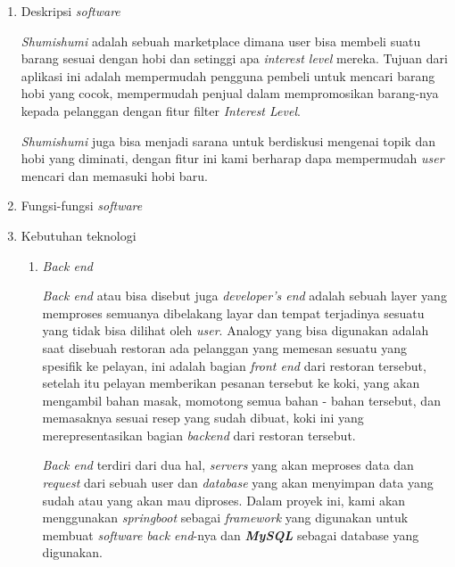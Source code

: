 \documentclass[a4paper]{article}
\begin{document}
\begin{enumerate}[label=\alph*. ]
    \item Deskripsi \textit{software}
    
    \textit{Shumishumi} adalah sebuah marketplace dimana user bisa membeli suatu barang sesuai dengan hobi dan setinggi apa \textit{interest level} mereka. Tujuan dari aplikasi ini adalah mempermudah pengguna pembeli untuk mencari barang hobi yang cocok, mempermudah penjual dalam mempromosikan barang-nya kepada pelanggan dengan fitur filter \textit{Interest Level}. 


    \textit{Shumishumi} juga bisa menjadi sarana untuk berdiskusi mengenai topik dan hobi yang diminati, dengan fitur ini kami berharap dapa mempermudah \textit{user} mencari dan memasuki hobi baru.

    \item Fungsi-fungsi \textit{software}


    \item Kebutuhan teknologi

    \begin{enumerate}
        \item \textit{Back end} 

        \textit{Back end} atau bisa disebut juga \textit{developer's end} adalah sebuah layer yang memproses semuanya dibelakang layar dan tempat terjadinya sesuatu yang tidak bisa dilihat oleh \textit{user}\autocite{letsgodojo-frontend-backend}. Analogy yang bisa digunakan adalah saat disebuah restoran ada pelanggan yang memesan sesuatu yang spesifik ke pelayan, ini adalah bagian \textit{front end} dari restoran tersebut, setelah itu pelayan memberikan pesanan tersebut ke koki, yang akan mengambil bahan masak, momotong semua bahan - bahan tersebut, dan memasaknya sesuai resep yang sudah dibuat, koki ini yang merepresentasikan bagian \textit{backend} dari restoran tersebut\autocite{codecademy-backend}. 

        \textit{Back end} terdiri dari dua hal, \textit{servers} yang akan meproses data dan \textit{request} dari sebuah user dan \textit{database} yang akan menyimpan data yang sudah atau yang akan mau diproses\autocite{codecademy-backend}. Dalam proyek ini, kami akan menggunakan \textit{springboot} sebagai \textit{framework} yang digunakan untuk membuat \textit{software back end}-nya dan \textit{\textbf{MySQL}} sebagai database yang digunakan.


\end{enumerate}
\end{enumerate}
\end{document}
